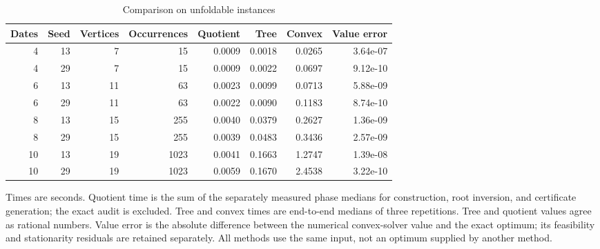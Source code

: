 \begin{table}[p]
\centering\small
\caption{Comparison on unfoldable instances}\label{tab:comparison}
\begin{tabular}{rrrrrrrr}
\toprule
Dates & Seed & Vertices & Occurrences & Quotient & Tree & Convex & Value error \\
\midrule
4 & 13 & 7 & 15 & 0.0009 & 0.0018 & 0.0265 & 3.64e-07 \\
4 & 29 & 7 & 15 & 0.0009 & 0.0022 & 0.0697 & 9.12e-10 \\
6 & 13 & 11 & 63 & 0.0023 & 0.0099 & 0.0713 & 5.88e-09 \\
6 & 29 & 11 & 63 & 0.0022 & 0.0090 & 0.1183 & 8.74e-10 \\
8 & 13 & 15 & 255 & 0.0040 & 0.0379 & 0.2627 & 1.36e-09 \\
8 & 29 & 15 & 255 & 0.0039 & 0.0483 & 0.3436 & 2.57e-09 \\
10 & 13 & 19 & 1023 & 0.0041 & 0.1663 & 1.2747 & 1.39e-08 \\
10 & 29 & 19 & 1023 & 0.0059 & 0.1670 & 2.4538 & 3.22e-10 \\
\bottomrule
\end{tabular}
\par\smallskip\begin{minipage}{\textwidth}\footnotesize Times are seconds. Quotient time is the sum of the separately measured phase medians for construction, root inversion, and certificate generation; the exact audit is excluded. Tree and convex times are end-to-end medians of three repetitions. Tree and quotient values agree as rational numbers. Value error is the absolute difference between the numerical convex-solver value and the exact optimum; its feasibility and stationarity residuals are retained separately. All methods use the same input, not an optimum supplied by another method.\end{minipage}
\end{table}
